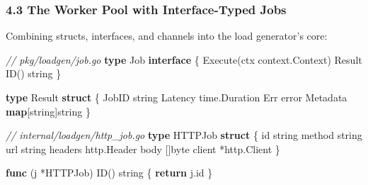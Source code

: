 \documentclass[
]{article}
\newenvironment{Shaded}{}{}
\newcommand{\CommentTok}[1]{\textcolor[rgb]{0.38,0.63,0.69}{\textit{#1}}}
\newcommand{\ControlFlowTok}[1]{\textcolor[rgb]{0.00,0.44,0.13}{\textbf{#1}}}
\newcommand{\DataTypeTok}[1]{\textcolor[rgb]{0.56,0.13,0.00}{#1}}
\newcommand{\KeywordTok}[1]{\textcolor[rgb]{0.00,0.44,0.13}{\textbf{#1}}}
\newcommand{\NormalTok}[1]{#1}
\newcommand{\OperatorTok}[1]{\textcolor[rgb]{0.40,0.40,0.40}{#1}}
\begin{document}
\hypertarget{the-worker-pool-with-interface-typed-jobs}{%
\subsubsection{4.3 The Worker Pool with Interface-Typed
Jobs}\label{the-worker-pool-with-interface-typed-jobs}}

Combining structs, interfaces, and channels into the load generator's
core:

\begin{Shaded}
\begin{Highlighting}[]
\CommentTok{// pkg/loadgen/job.go}
\KeywordTok{type}\NormalTok{ Job }\KeywordTok{interface} \OperatorTok{\{}
\NormalTok{    Execute}\OperatorTok{(}\NormalTok{ctx context}\OperatorTok{.}\NormalTok{Context}\OperatorTok{)}\NormalTok{ Result}
\NormalTok{    ID}\OperatorTok{()} \DataTypeTok{string}
\OperatorTok{\}}

\KeywordTok{type}\NormalTok{ Result }\KeywordTok{struct} \OperatorTok{\{}
\NormalTok{    JobID    }\DataTypeTok{string}
\NormalTok{    Latency  time}\OperatorTok{.}\NormalTok{Duration}
\NormalTok{    Err      }\DataTypeTok{error}
\NormalTok{    Metadata }\KeywordTok{map}\OperatorTok{[}\DataTypeTok{string}\OperatorTok{]}\DataTypeTok{string}
\OperatorTok{\}}

\CommentTok{// internal/loadgen/http\_job.go}
\KeywordTok{type}\NormalTok{ HTTPJob }\KeywordTok{struct} \OperatorTok{\{}
\NormalTok{    id       }\DataTypeTok{string}
\NormalTok{    method   }\DataTypeTok{string}
\NormalTok{    url      }\DataTypeTok{string}
\NormalTok{    headers  http}\OperatorTok{.}\NormalTok{Header}
\NormalTok{    body     }\OperatorTok{[]}\DataTypeTok{byte}
\NormalTok{    client   }\OperatorTok{*}\NormalTok{http}\OperatorTok{.}\NormalTok{Client}
\OperatorTok{\}}

\KeywordTok{func} \OperatorTok{(}\NormalTok{j }\OperatorTok{*}\NormalTok{HTTPJob}\OperatorTok{)}\NormalTok{ ID}\OperatorTok{()} \DataTypeTok{string} \OperatorTok{\{} \ControlFlowTok{return}\NormalTok{ j}\OperatorTok{.}\NormalTok{id }\OperatorTok{\}}


\end{Highlighting}
\end{Shaded}
\end{document}
